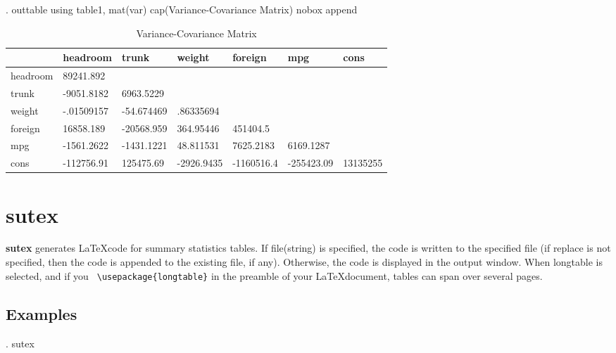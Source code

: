 \documentclass[12pt]{article}
\begin{document}
. outtable using table1, mat(var) cap(Variance-Covariance Matrix) nobox append
\begin{table}[htbp]
\caption{\label{clabel} Variance-Covariance Matrix}\centering\medskip
\begin{tabular}{lllllll} \hline \hline
 & headroom  & trunk  & weight  & foreign  & mpg  & cons  \\  \hline
headroom & 89241.892 \\
trunk & -9051.8182 & 6963.5229 \\
weight & -.01509157 & -54.674469 & .86335694 \\
foreign & 16858.189 & -20568.959 & 364.95446 & 451404.5 \\
mpg & -1561.2622 & -1431.1221 & 48.811531 & 7625.2183 & 6169.1287 \\
cons & -112756.91 & 125475.69 & -2926.9435 & -1160516.4 & -255423.09 & 13135255 \\
\hline \hline \end{tabular}
\end{table}



\section{sutex}

\noindent \textbf{sutex} generates \LaTeX code for summary statistics tables. If file(string) is specified, the code is written to the specified file (if replace is not specified, then the code is appended to the existing file, if any). Otherwise, the code is displayed in the output window. When longtable is selected, and if you \verb+ \usepackage{longtable}+ in the preamble of your \LaTeX document, tables can span over several pages.\\

\newpage
\subsection{Examples}
. sutex
\end{document}
